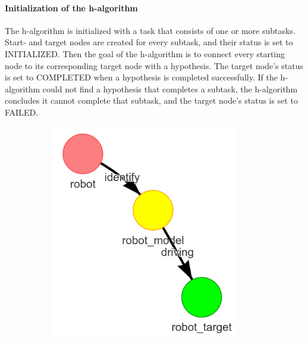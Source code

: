 \paragraph{Initialization of the \ac{h-algorithm}}
The \ac{h-algorithm} is initialized with a task that consists of one or more subtasks. Start- and target nodes are created for every subtask, and their status is set to INITIALIZED. Then the goal of the \ac{h-algorithm} is to connect every starting node to its corresponding target node with a hypothesis. The target node's status is set to COMPLETED when a hypothesis is completed successfully. If the \ac{h-algorithm} could not find a hypothesis that completes a subtask, the \ac{h-algorithm} concludes it cannot complete that subtask, and the target node's status is set to FAILED.\bs

\begin{figure}[H]
    \centering
    \begin{subfigure}{.3\textwidth}
    \centering
    \includegraphics[width=0.9\textwidth]{figures/proposed_method/connecting_nodes/robot_to_target/execute_robot_to_target_1}
    \end{subfigure}
    \begin{subfigure}{.3\textwidth}
    \centering

\end{subfigure}
\end{figure}
